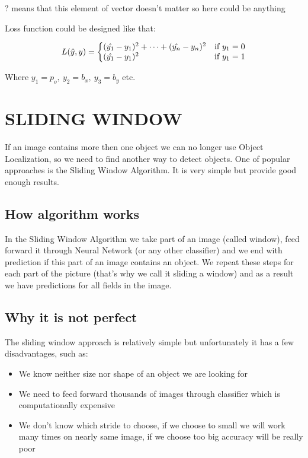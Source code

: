 \documentclass[letterpaper, 10 pt, conference]{ieeeconf}  %
\begin{document}
$?$ means that this element of vector doesn't matter so here could be anything

Loss function could be designed like that:

\begin{equation}
 L(\hat{y},y)=\left\{
  \begin{array}{@{}ll@{}}
    (\hat{y_1} - y_1)^2 + \dots + (\hat{y_n} - y_n)^2 & \text{if}\ y_1=0 \\
    (\hat{y_1} - y_1)^2 & \text{if}\ y_1=1
  \end{array}\right.
\end{equation} 

Where $y_1 = p_o, \: y_2 = b_x, \: y_3=b_y$ etc.

\section{SLIDING WINDOW}
If an image contains more then one object we can no longer use Object Localization, so we need to find another way to detect objects. One of popular approaches is the Sliding Window Algorithm. It is very simple but provide good enough results. 

\subsection{How algorithm works}
In the Sliding Window Algorithm we take part of an image (called window), feed forward it through Neural Network (or any other classifier) and we end with prediction if this part of an image contains an object. We repeat these steps for each part of the picture (that's why we call it sliding a window) and as a result we have predictions for all fields in the image.  

\subsection{Why it is not perfect}
The sliding window approach is relatively simple but unfortunately it has a few disadvantages, such as:

\begin{itemize}

\item We know neither size nor shape of an object we are looking for

\item We need to feed forward thousands of images through classifier which is computationally expensive

\item We don't know which stride to choose, if we choose to small we will work many times on nearly same image, if we choose too big accuracy will be really poor


\end{itemize}
\end{document}
